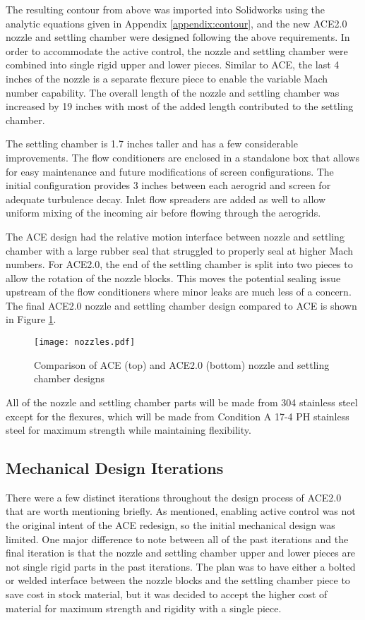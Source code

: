 The resulting contour from above was imported into Solidworks using the analytic equations given in Appendix \ref{appendix:contour}, and the new ACE2.0 nozzle and settling chamber were designed following the above requirements. In order to accommodate the active control, the nozzle and settling chamber were combined into single rigid upper and lower pieces. Similar to ACE, the last 4 inches of the nozzle is a separate flexure piece to enable the variable Mach number capability. The overall length of the nozzle and settling chamber was increased by 19 inches with most of the added length contributed to the settling chamber. 

The settling chamber is 1.7 inches taller and has a few considerable improvements. The flow conditioners are enclosed in a standalone box that allows for easy maintenance and future modifications of screen configurations. The initial configuration provides 3 inches between each aerogrid and screen for adequate turbulence decay. Inlet flow spreaders are added as well to allow uniform mixing of the incoming air before flowing through the aerogrids. 

The ACE design had the relative motion interface between nozzle and settling chamber with a large rubber seal that struggled to properly seal at higher Mach numbers. For ACE2.0, the end of the settling chamber is split into two pieces to allow the rotation of the nozzle blocks. This moves the potential sealing issue upstream of the flow conditioners where minor leaks are much less of a concern. The final ACE2.0 nozzle and settling chamber design compared to ACE is shown in Figure \ref{fig:nozzles}. 

\begin{figure}[ht!]
    \centering
    \texttt{[image: nozzles.pdf]}
    \caption{Comparison of ACE (top) and ACE2.0 (bottom) nozzle and settling chamber designs}
    \label{fig:nozzles}
\end{figure}

All of the nozzle and settling chamber parts will be made from 304 stainless steel except for the flexures, which will be made from Condition A 17-4 PH stainless steel for maximum strength while maintaining flexibility.

\subsection{Mechanical Design Iterations}

There were a few distinct iterations throughout the design process of ACE2.0 that are worth mentioning briefly. As mentioned, enabling active control was not the original intent of the ACE redesign, so the initial mechanical design was limited. One major difference to note between all of the past iterations and the final iteration is that the nozzle and settling chamber upper and lower pieces are not single rigid parts in the past iterations. The plan was to have either a bolted or welded interface between the nozzle blocks and the settling chamber piece to save cost in stock material, but it was decided to accept the higher cost of material for maximum strength and rigidity with a single piece.

